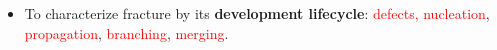 \begin{frame}
\begin{itemize}
    \item<7-> To characterize fracture by its \textbf{development lifecycle}: \textcolor<8>{red}{defects, nucleation}, \textcolor<9>{red}{propagation}, \textcolor<10>{red}{branching}, \textcolor<11>{red}{merging}. \\
    

\end{itemize}
\end{frame}

